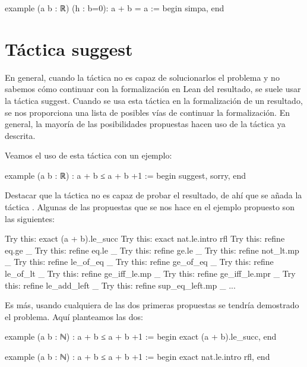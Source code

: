 \begin{leancode}
example (a b : ℝ) (h : b=0): a + b = a :=
begin
  simpa,
end
\end{leancode}

\section{Táctica suggest}

En general, cuando la táctica 
no es capaz de solucionarlos el problema y no sabemos cómo continuar con
la formalización en Lean del resultado, se suele usar la táctica
 {suggest}. Cuando se usa esta táctica en la
formalización de un resultado, se nos proporciona una lista de posibles
vías de continuar la formalización. En general, la mayoría de las
posibilidades propuestas hacen uso de la táctica
 ya descrita.

Veamos el uso de esta táctica con un ejemplo:

\begin{leancode}
example (a b : ℝ) : a + b ≤ a + b +1 :=
begin
  suggest,
  sorry,
end
\end{leancode}

Destacar que la táctica  no es capaz de
probar el resultado, de ahí que se añada la táctica
. Algunas de las propuestas que se nos hace en el
ejemplo propuesto son las siguientes:

\begin{leancode}
Try this: exact (a + b).le_succ
Try this: exact nat.le.intro rfl
Try this: refine eq.ge _
Try this: refine eq.le _
Try this: refine ge.le _
Try this: refine not_lt.mp _
Try this: refine le_of_eq _
Try this: refine ge_of_eq _
Try this: refine le_of_lt _
Try this: refine ge_iff_le.mp _
Try this: refine ge_iff_le.mpr _
Try this: refine le_add_left _
Try this: refine sup_eq_left.mp _
...
\end{leancode}

Es más, usando cualquiera de las dos primeras propuestas se tendría
demostrado el problema. Aquí planteamos las dos:

\begin{leancode}
example (a b : ℕ) : a + b ≤ a + b +1 :=
begin
  exact (a + b).le_succ,
end

example (a b : ℕ) : a + b ≤ a + b +1 :=
begin
  exact nat.le.intro rfl,
end
\end{leancode}


